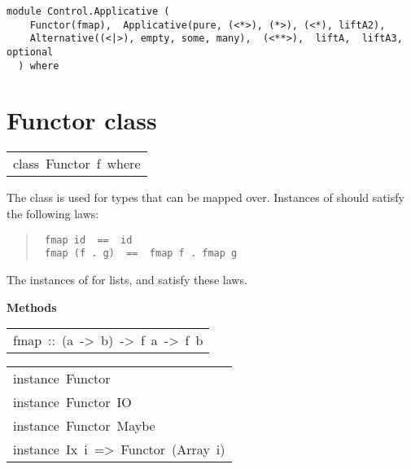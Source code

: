\label{module:Control.Applicative}
\haddockbeginheader
{\haddockverb\begin{verbatim}
module Control.Applicative (
    Functor(fmap),  Applicative(pure, (<*>), (*>), (<*), liftA2),
    Alternative((<|>), empty, some, many),  (<**>),  liftA,  liftA3,  optional
  ) where\end{verbatim}}
\haddockendheader

\section{Functor class
}
\begin{haddockdesc}
\item[\begin{tabular}{@{}l}
class\ Functor\ f\ where
\end{tabular}]\haddockbegindoc
The  class is used for types that can be mapped over.
Instances of  should satisfy the following laws:
\par
\begin{quote}
{\haddockverb\begin{verbatim}
 fmap id  ==  id
 fmap (f . g)  ==  fmap f . fmap g
\end{verbatim}}
\end{quote}
The instances of  for lists,  and 
satisfy these laws.
\par

\haddockpremethods{}\textbf{Methods}
\begin{haddockdesc}
\item[\begin{tabular}{@{}l}
fmap\ ::\ (a\ ->\ b)\ ->\ f\ a\ ->\ f\ b
\end{tabular}]
\end{haddockdesc}
\end{haddockdesc}
\begin{haddockdesc}
\item[\begin{tabular}{@{}l}
instance\ Functor\ {\char 91}{\char 93}\\instance\ Functor\ IO\\instance\ Functor\ Maybe\\instance\ Ix\ i\ =>\ Functor\ (Array\ i)
\end{tabular}]
\end{haddockdesc}

